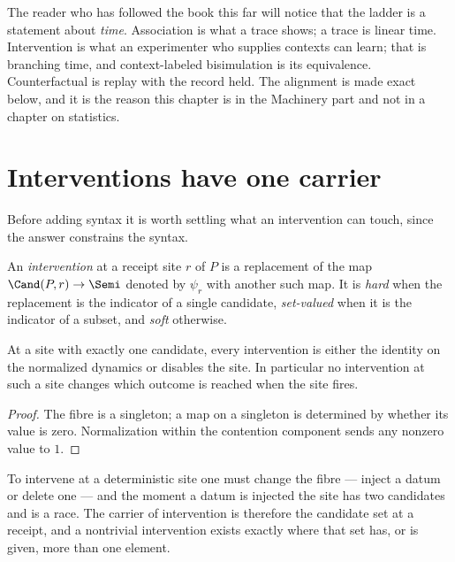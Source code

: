 The reader who has followed the book this far will notice that the ladder is a statement about
\emph{time}. Association is what a trace shows; a trace is linear time. Intervention is what an
experimenter who supplies contexts can learn; that is branching time, and context-labeled
bisimulation is its equivalence. Counterfactual is replay with the record held. The alignment is
made exact below, and it is the reason this chapter is in the Machinery part and not in a chapter
on statistics.

\section{Interventions have one carrier}
\label{do:sec:carrier}

Before adding syntax it is worth settling what an intervention can touch, since the answer
constrains the syntax.

\begin{definition}
\label{do:def:intervention}
An \emph{intervention} at a receipt site $r$ of $P$ is a replacement of the map
$\Cand(P,r) \to \Semi$ denoted by $\psi_r$ with another such map. It is \emph{hard} when the
replacement is the indicator of a single candidate, \emph{set-valued} when it is the indicator of
a subset, and \emph{soft} otherwise.
\end{definition}

\begin{proposition}
\label{do:prop:transparent}
At a site with exactly one candidate, every intervention is either the identity on the normalized
dynamics or disables the site. In particular no intervention at such a site changes which outcome
is reached when the site fires.
\end{proposition}

\begin{proof}
The fibre is a singleton; a map on a singleton is determined by whether its value is zero.
Normalization within the contention component sends any nonzero value to $1$.
\end{proof}

To intervene at a deterministic site one must change the fibre --- inject a datum or delete one ---
and the moment a datum is injected the site has two candidates and is a race. The carrier of
intervention is therefore the candidate set at a receipt, and a nontrivial intervention exists
exactly where that set has, or is given, more than one element.

